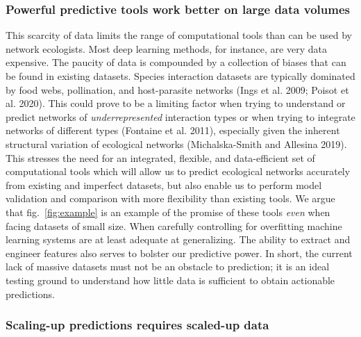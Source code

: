 \documentclass[10pt,oneside]{article}
\begin{document}
\hypertarget{powerful-predictive-tools-work-better-on-large-data-volumes}{%
\subsubsection{Powerful predictive tools work better on large data
volumes}\label{powerful-predictive-tools-work-better-on-large-data-volumes}}

This scarcity of data limits the range of computational tools than can
be used by network ecologists. Most deep learning methods, for instance,
are very data expensive. The paucity of data is compounded by a
collection of biases that can be found in existing datasets. Species
interaction datasets are typically dominated by food webs, pollination,
and host-parasite networks (Ings et al. 2009; Poisot et al. 2020). This
could prove to be a limiting factor when trying to understand or predict
networks of \emph{underrepresented} interaction types or when trying to
integrate networks of different types (Fontaine et al. 2011), especially
given the inherent structural variation of ecological networks
(Michalska-Smith and Allesina 2019). This stresses the need for an
integrated, flexible, and data-efficient set of computational tools
which will allow us to predict ecological networks accurately from
existing and imperfect datasets, but also enable us to perform model
validation and comparison with more flexibility than existing tools. We
argue that fig.~\ref{fig:example} is an example of the promise of these
tools \emph{even} when facing datasets of small size. When carefully
controlling for overfitting machine learning systems are at least
adequate at generalizing. The ability to extract and engineer features
also serves to bolster our predictive power. In short, the current lack
of massive datasets must not be an obstacle to prediction; it is an
ideal testing ground to understand how little data is sufficient to
obtain actionable predictions.

\hypertarget{scaling-up-predictions-requires-scaled-up-data}{%
\subsubsection{Scaling-up predictions requires scaled-up
data}\label{scaling-up-predictions-requires-scaled-up-data}}
\end{document}
